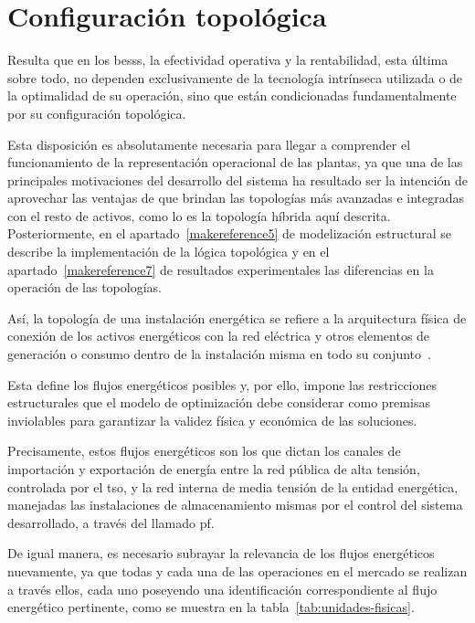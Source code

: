 \section{Configuración topológica}
\label{makereference3.1}

Resulta que en los \glspl{bess}, la efectividad operativa y la rentabilidad, esta última sobre todo, no dependen exclusivamente de la tecnología intrínseca utilizada o de la optimalidad de su operación, sino que están condicionadas fundamentalmente por su configuración topológica.

Esta disposición es absolutamente necesaria para llegar a comprender el funcionamiento de la representación operacional de las plantas, ya que una de las principales motivaciones del desarrollo del sistema ha resultado ser la intención de aprovechar las ventajas de que brindan las topologías más avanzadas e integradas con el resto de activos, como lo es la topología híbrida aquí descrita. Posteriormente, en el apartado~\ref{makereference5} de modelización estructural se describe la implementación de la lógica topológica y en el apartado~\ref{makereference7} de resultados experimentales las diferencias en la operación de las topologías.

Así, la topología de una instalación energética se refiere a la arquitectura física de conexión de los activos energéticos con la red eléctrica y otros elementos de generación o consumo dentro de la instalación misma en todo su conjunto~\cite{parlikar2019topology}.

Esta define los flujos energéticos posibles y, por ello, impone las restricciones estructurales que el modelo de optimización debe considerar como premisas inviolables para garantizar la validez física y económica de las soluciones.

Precisamente, estos flujos energéticos son los que dictan los canales de importación y exportación de energía entre la red pública de alta tensión, controlada por el \gls{tso}, y la red interna de media tensión de la entidad energética, manejadas las instalaciones de almacenamiento mismas por el control del sistema desarrollado, a través del llamado \gls{pf}.

De igual manera, es necesario subrayar la relevancia de los flujos energéticos nuevamente, ya que todas y cada una de las operaciones en el mercado se realizan a través ellos, cada uno poseyendo una identificación correspondiente al flujo energético pertinente, como se muestra en la tabla~\ref{tab:unidades-fisicas}.

